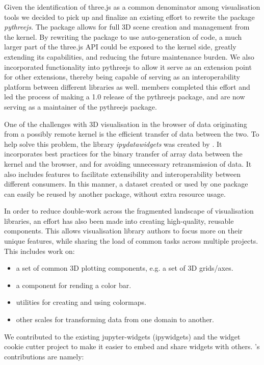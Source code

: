 \documentclass{deliverablereport}
\begin{document}
Given the identification of three.js as a common denominator among visualisation tools
we decided to pick up and finalize an existing effort to rewrite the package
\emph{pythreejs}. The package allows for full 3D scene creation and management from the
kernel. By rewriting the package to use auto-generation of code, a much larger
part of the three.js API could be exposed to the kernel side, greatly extending
its capabilities, and reducing the future maintenance burden. We also incorporated
functionality into pythreejs to allow it serve as an extension
point for other extensions, thereby being capable of serving as an interoperability
platform between different libraries as well.
\ODK members completed this effort and led the process of making a 1.0 release of the pythreejs package,
and are now serving as a maintainer of the pythreejs package.

One of the challenges with 3D visualisation in the browser of data originating from
a possibly remote kernel is the efficient transfer of data between the two. To help
solve this problem, the library \emph{ipydatawidgets} was created by \ODK. It incorporates
best practices for the binary transfer of array data between the kernel and the browser,
and for avoiding unnecessary retransmission of data. It also includes features to
facilitate extensibility and interoperability between different consumers. In this
manner, a dataset created or used by one package can easily be reused by another package,
without extra resource usage.

In order to reduce double-work across the fragmented landscape of visualisation
libraries, an effort has also been made into creating high-quality, reusable
components. This allows visualisation library authors to focus more on their
unique features, while sharing the load of common tasks across multiple projects.
This includes work on:

\begin{itemize}
\item a set of common 3D plotting components, e.g. a set of 3D grids/axes.
\item a component for rending a color bar.
\item utilities for creating and using colormaps.
\item other scales for transforming data from one domain to another.
\end{itemize}

We contributed to the existing jupyter-widgets (ipywidgets) and the widget cookie
cutter project to make it easier to embed and share widgets with
others. \ODK's contributions are namely:
\end{document}
